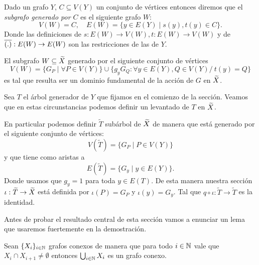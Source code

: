 \documentclass[tesis.tex]{subfiles}
\begin{document}
\begin{deff}
	Dado un grafo $Y$, $C \subseteq V(Y)$ un conjunto de vértices entonces diremos que el \emph{subgrafo generado por $C$} es el siguiente grafo $W$:
	\[
		V(W) = C, \quad E(W) = \{ y \in E(Y) \mid s(y), t(y) \in C \}.
	\]
	Donde las definiciones de $s:E(W) \to V(W), t:E(W) \to V(W)$ y de $\overline{(.)}:E(W) \to E(W)$ son las restricciones de las de $Y$.
\end{deff}

\begin{obs}\label{obs_subgrafo_dom_fund}
	El subgrafo $W \subseteq \widetilde X$ generado por el siguiente conjunto de vértices
\[
V(W) = \{ G_{P} \mid \forall P \in V(Y) \} \cup \{ g_{y}G_{Q} : \forall y \in E(Y), Q \in V(Y) / \ t(y) = Q  \}
\]
es tal que resulta ser un dominio fundamental de la acción de $G$ en $\widetilde X$.

\end{obs}

Sea $T$ el árbol generador de $Y$ que fijamos en el comienzo de la sección.
Veamos que en estas circunstancias podemos definir un levantado de $T$ en $\widetilde X$.


\begin{obs}\label{obs_levantado_arbol}
	En particular podemos definir $\widetilde {T}$ subárbol de $\widetilde X$ de manera que está generado por el siguiente conjunto de vértices:
	\[
	V(\widetilde T) = \{ G_P \mid P \in V(Y) \}
	\]
	y que tiene como aristas a
	\[
	E(\widetilde T) = \{ G_{y} \mid y \in E(Y) \}.	
	\]
	Donde usamos que $g_{y} = 1$ para toda $y \in E(T)$.
	De esta manera nuestra sección $\iota:\widetilde T \to \widetilde X$ está definida por 
	$\iota(P) =  G_P$ y $\iota(y) = G_y$.
	Tal que $q \circ \iota:\widetilde T \to \widetilde{T}$ es la identidad. 
\end{obs}

Antes de probar el resultado central de esta sección vamos a enunciar un lema que usaremos fuertemente en la demostración.

\begin{lema}\label{lema_union_conexos_es_conexo}
	Sean $\{X_{i}\}_{i \in \mathbb{N}}$ grafos conexos de manera que para todo $i \in \mathbb{N}$ vale que	
	$X_{i} \cap X_{i+1} \neq \emptyset$ 
	entonces $\bigcup_{i \in \mathbb{N}} X_{i}$ es un grafo conexo.
\end{lema}
\end{document}
